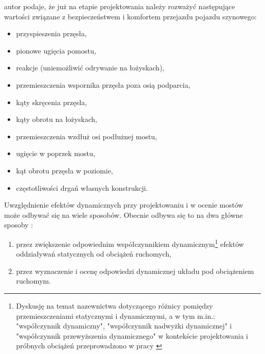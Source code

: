 \parencite{Niemierko} autor podaje, że już na etapie projektowania należy rozważyć następujące wartości związane z bezpieczeństwem i komfortem przejazdu pojazdu szynowego:
\begin{itemize}
	\item przyspieszenia przęsła,
	\item pionowe ugięcia pomostu,
	\item reakcje (uniemożliwić odrywanie na łożyskach),
	\item przemieszczenia wspornika przęsła poza osią podparcia,
	\item kąty skręcenia przęsła,
	\item kąty obrotu na łożyskach,
	\item przemieszczenia wzdłuż osi podłużnej mostu,
	\item ugięcie w poprzek mostu,
	\item kąt obrotu przęsła w poziomie,
	\item częstotliwości drgań własnych konstrukcji.
\end{itemize}

Uwzględnienie efektów dynamicznych przy projektowaniu i w ocenie mostów może odbywać się na wiele sposobów. Obecnie odbywa się to na dwa główne sposoby \parencite{Goicolea2008a}:
\begin{enumerate}
	\item przez zwiększenie odpowiednim współczynnikiem dynamicznym\footnote{
		Dyskusję na temat nazewnictwa dotyczącego różnicy pomiędzy przemieszczeniami statycznymi i dynamicznymi, a w tym m.in.: "współczynnik dynamiczny", "współczynnik nadwyżki dynamicznej" i "współczynnik przewyższenia dynamicznego" w kontekście projektowania i próbnych obciążeń przeprowadzono w pracy \parencite{Poprawa2018}} 
	efektów oddziaływań statycznych od obciążeń ruchomych,
	\item przez wyznaczenie i ocenę odpowiedzi dynamicznej układu pod obciążeniem ruchomym.
\end{enumerate}

